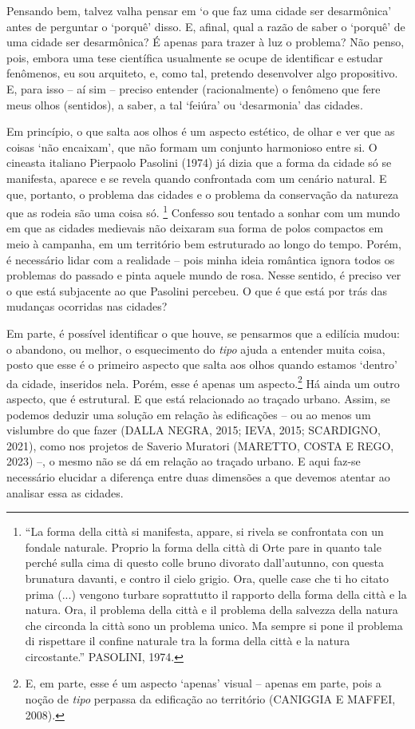 \documentclass[12pt, a4paper]{book} %
\begin{document}
            Pensando bem, talvez valha pensar em `o que faz uma cidade ser desarmônica' antes de perguntar o `porquê' disso. E, afinal, qual a razão de saber o `porquê' de uma cidade ser desarmônica? É apenas para trazer à luz o problema? Não penso, pois, embora uma tese científica usualmente se ocupe de identificar e estudar fenômenos, eu sou arquiteto, e, como tal, pretendo desenvolver algo propositivo. E, para isso – aí sim – preciso entender (racionalmente) o fenômeno que fere meus olhos (sentidos), a saber, a tal `feiúra' ou `desarmonia' das cidades. 
	
	        Em princípio, o que salta aos olhos é um aspecto estético, de olhar e ver que as coisas `não encaixam', que não formam um conjunto harmonioso entre si. O cineasta italiano Pierpaolo Pasolini (1974) já dizia que a forma da cidade só se manifesta, aparece e se revela quando confrontada com um cenário natural. E que, portanto, o problema das cidades e o problema da conservação da natureza que as rodeia são uma coisa só.
                \footnote[4]{“La forma della città si manifesta, appare, si rivela se confrontata con un fondale naturale. Proprio la forma della città di Orte pare in quanto tale perché sulla cima di questo colle bruno divorato dall’autunno, con questa brunatura davanti, e contro il cielo grigio. Ora, quelle case che ti ho citato prima (...) vengono turbare soprattutto il rapporto della forma della città e la natura. Ora, il problema della città e il problema della salvezza della natura che circonda la città sono un problema unico. Ma sempre si pone il problema di rispettare il confine naturale tra la forma della città e la natura circostante.” PASOLINI, 1974.} 
            Confesso sou tentado a sonhar com um mundo em que as cidades medievais não deixaram sua forma de polos compactos em meio à campanha, em um território bem estruturado ao longo do tempo. Porém, é necessário lidar com a realidade – pois minha ideia romântica ignora todos os problemas do passado e pinta aquele mundo de rosa.  Nesse sentido, é preciso ver o que está subjacente ao que Pasolini percebeu. O que é que está por trás das mudanças ocorridas nas cidades? 

            Em parte, é possível identificar o que houve, se pensarmos que a edilícia mudou: o abandono, ou melhor, o esquecimento do \textit{tipo} ajuda a entender muita coisa, posto que esse é o primeiro aspecto que salta aos olhos quando estamos `dentro' da cidade, inseridos nela. Porém, esse é apenas um aspecto.\footnote[5]{E, em parte, esse é um aspecto `apenas' visual – apenas em parte, pois a noção de \textit{tipo} perpassa da edificação ao território (CANIGGIA E MAFFEI, 2008). } Há ainda um outro aspecto, que é estrutural. E que está relacionado ao traçado urbano. Assim, se podemos deduzir uma solução em relação às edificações – ou ao menos um vislumbre do que fazer (DALLA NEGRA, 2015; IEVA, 2015; SCARDIGNO, 2021), como nos projetos de Saverio Muratori (MARETTO, COSTA E REGO, 2023) –, o mesmo não se dá em relação ao traçado urbano. E aqui faz-se necessário elucidar a diferença entre duas dimensões a que devemos atentar ao analisar essa as cidades. 
	
\end{document}
